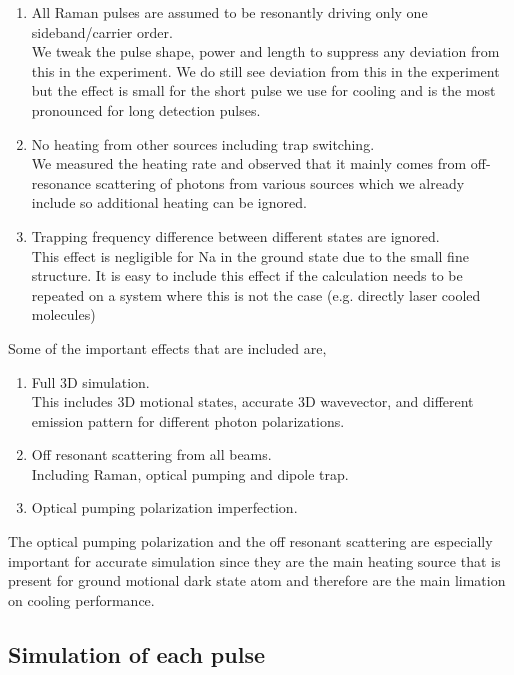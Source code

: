 \documentclass[aps,twocolumn,secnumarabic,balancelastpage,amsmath,amssymb]{revtex4}
\begin{document}
\begin{enumerate}
\item All Raman pulses are assumed to be resonantly driving only one sideband/carrier order.\\
  We tweak the pulse shape, power and length to suppress any deviation
  from this in the experiment. We do still see deviation from this in the experiment
  but the effect is small for the short pulse we use for cooling and is the most pronounced
  for long detection pulses.
\item No heating from other sources including trap switching.\\
  We measured the heating rate and observed that it mainly comes from off-resonance scattering
  of photons from various sources which we already include so additional heating can be
  ignored.
\item Trapping frequency difference between different states are ignored.\\
  This effect is negligible for Na in the ground state due to the small fine structure.
  It is easy to include this effect if the calculation needs to be repeated on a system where
  this is not the case (e.g. directly laser cooled molecules)
\end{enumerate}

Some of the important effects that are included are,
\begin{enumerate}
\item Full 3D simulation.\\
  This includes 3D motional states, accurate 3D wavevector, and different emission pattern
  for different photon polarizations.
\item Off resonant scattering from all beams.\\
  Including Raman, optical pumping and dipole trap.
\item Optical pumping polarization imperfection.
\end{enumerate}

The optical pumping polarization and the off resonant scattering are especially important
for accurate simulation since they are the main heating source that is present
for ground motional dark state atom and therefore are the main limation on cooling performance.

\subsection{Simulation of each pulse}
\end{document}
